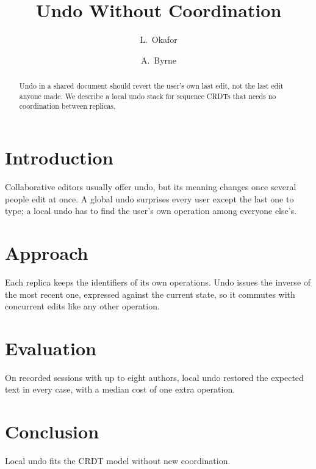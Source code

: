 \documentclass[10pt,twocolumn]{article}
\title{\bf Undo Without Coordination}
\author{L.~Okafor \and A.~Byrne}
\date{}
\begin{document}
\maketitle

\begin{abstract}
Undo in a shared document should revert the user's own last edit, not the
last edit anyone made. We describe a local undo stack for sequence CRDTs that
needs no coordination between replicas.
\end{abstract}

\section{Introduction}
Collaborative editors usually offer undo, but its meaning changes once several
people edit at once. A global undo surprises every user except the last one to
type; a local undo has to find the user's own operation among everyone
else's.

\section{Approach}
Each replica keeps the identifiers of its own operations. Undo issues the
inverse of the most recent one, expressed against the current state, so it
commutes with concurrent edits like any other operation.

\section{Evaluation}
On recorded sessions with up to eight authors, local undo restored the
expected text in every case, with a median cost of one extra operation.

\section{Conclusion}
Local undo fits the CRDT model without new coordination.
\end{document}
